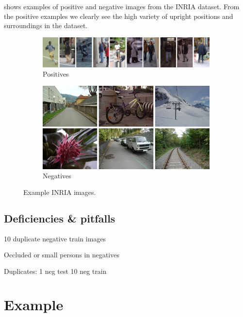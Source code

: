 \documentclass[thesis.tex]{subfiles}
\begin{document}
 shows examples of positive  and negative  images from the INRIA dataset. From the positive examples we clearly see the high variety of upright positions and surroundings in the dataset.

\begin{figure}
	\centering
	\begin{subfigure}[t]{\textwidth}
		\includegraphics[width=\textwidth]{img/inriaPositives.png}
		\caption{Positives}
		\label{fig:inriaPositives}
		\vspace{2mm}
	\end{subfigure}
	\begin{subfigure}[t]{\textwidth}
		\includegraphics[width=\textwidth]{img/inriaNegatives.png}
		\caption{Negatives}
		\label{fig:inriaNegatives}
	\end{subfigure}
	\caption{Example INRIA images.}
	\label{fig:inriaExampleImages}
\end{figure}

\subsection{Deficiencies \& pitfalls}
10 duplicate negative train images

Occluded or small persons in negatives

Duplicates:
1 neg test
10 neg train

\section{Example}
\end{document}
